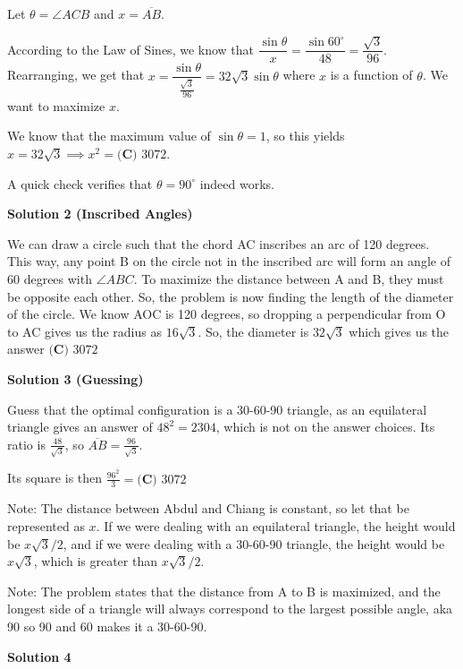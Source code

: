 \begin{enumerate}
 Let $\theta=\angle ACB$ and $x=\overline{AB}$. 

 According to the Law of Sines, we know that $\dfrac{\sin\theta}x=\dfrac{\sin60^\circ}{48}=\dfrac{\sqrt3}{96}$. Rearranging, we get that $x=\dfrac{\sin\theta}{\frac{\sqrt3}{96}}=32\sqrt3\sin\theta$ where $x$ is a function of $\theta$. We want to maximize $x$. 

 We know that the maximum value of $\sin\theta=1$, so this yields $x=32\sqrt3\implies x^2=\boxed{\textbf{(C) }3072.}$ 

 A quick check verifies that $\theta=90^\circ$ indeed works. 

 



\textbf{Solution 2 (Inscribed Angles)}

We can draw a circle such that the chord AC inscribes an arc of 120 degrees. This way, any point B on the circle not in the inscribed arc will form an angle of 60 degrees with $\angle{ABC}$. To maximize the distance between A and B, they must be opposite each other. So, the problem is now finding the length of the diameter of the circle. We know AOC is 120 degrees, so dropping a perpendicular from O to AC gives us the radius as $16\sqrt{3}$. So, the diameter is $32\sqrt{3}$ which gives us the answer $\boxed{\textbf{(C) }3072}$




\textbf{Solution 3 (Guessing)}

Guess that the optimal configuration is a 30-60-90 triangle, as an equilateral triangle gives an answer of $48^2=2304$, which is not on the answer choices. Its ratio is $\frac{48}{\sqrt{3}}$, so $\overline{AB}=\frac{96}{\sqrt{3}}$.

 Its square is then $\frac{96^2}{3}=\boxed{\textbf{(C) }3072}$

 Note: The distance between Abdul and Chiang is constant, so let that be represented as ${x}$. If we were dealing with an equilateral triangle, the height would be ${{x\sqrt3}/2}$, and if we were dealing with a 30-60-90 triangle, the height would be ${x\sqrt3}$, which is greater than ${{x\sqrt3}/2}$.

 Note: The problem states that the distance from A to B is maximized, and the longest side of a triangle will always correspond to the largest possible angle, aka 90 so 90 and 60 makes it a 30-60-90.

 



\textbf{Solution 4}


\end{enumerate}
